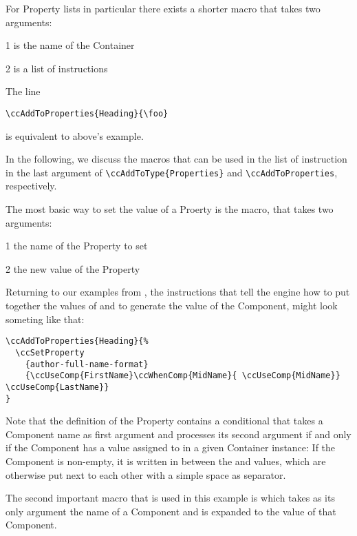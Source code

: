 For Property lists in particular there exists a shorter macro
\DescribeMacro{\ccAddToProperties} that takes two arguments:
\begin{ArgList}
\item[1] is the name of the Container
\item[2] is a list of instructions
\end{ArgList}
The line
\begin{lstlisting}[style=tex]
\ccAddToProperties{Heading}{\foo}
\end{lstlisting}
is equivalent to above's example.

In the following, we discuss the macros that can be used in the list of instruction in the last argument of
\lstinline|\ccAddToType{Properties}| and
\lstinline|\ccAddToProperties|, respectively.

The most basic way to set the value of a Proerty is the
\DescribeMacro{\ccSetProperty} macro, that takes two arguments:
\begin{ArgList}
\item[1] the name of the Property to set
\item[2] the new value of the Property
\end{ArgList}
Returning to our examples from , the
instructions that tell the engine how to put together the values of
 and  to generate
the value of the  Component, might look
someting like that:
\begin{lstlisting}[style=tex]
\ccAddToProperties{Heading}{%
  \ccSetProperty
    {author-full-name-format}
    {\ccUseComp{FirstName}\ccWhenComp{MidName}{ \ccUseComp{MidName}} \ccUseComp{LastName}}
}
\end{lstlisting}
Note that the definition of the Property
 contains a conditional
\UsageMacro{\ccWhenComp} that takes a Component name as first argument
 and processes its second argument  if and
only if the Component has a value assigned to in a given Container
instance: If the  Component is non-empty, it
is written in between the  and
 values, which are otherwise put next to
each other with a simple space as separator.

The second important macro that is used in this example is
\DescribeMacro{\ccUseComp} which takes as its only argument
 the name of a Component and is expanded to the value of
that Component.

